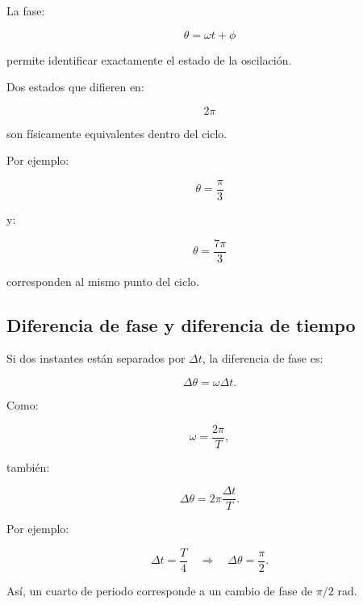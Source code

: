 La fase:

\[ \theta=\omega t+\phi \]

permite identificar exactamente el estado de la oscilación.

Dos estados que difieren en:

\[ 2\pi \]

son físicamente equivalentes dentro del ciclo.

Por ejemplo:

\[ \theta=\frac{\pi}{3} \]

y:

\[ \theta=\frac{7\pi}{3} \]

corresponden al mismo punto del ciclo.

\subsection{Diferencia de fase y diferencia de tiempo}

Si dos instantes están separados por \(\Delta t\), la diferencia de fase es:

\[ \boxed{\Delta\theta=\omega\Delta t}. \]

Como:

\[ \omega=\frac{2\pi}{T}, \]

también:

\[ \boxed{\Delta\theta=2\pi\frac{\Delta t}{T}}. \]

Por ejemplo:

\[
\Delta t=\frac{T}{4}
\quad\Longrightarrow\quad
\Delta\theta=\frac{\pi}{2}.
\]

Así, un cuarto de periodo corresponde a un cambio de fase de \(\pi/2\) rad.

